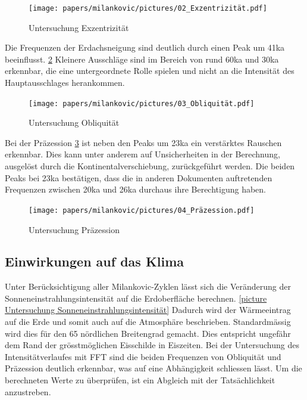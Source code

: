 \begin{figure}
	\centering
	\texttt{[image: papers/milankovic/pictures/02\_Exzentrizität.pdf]}
	\caption{Untersuchung Exzentrizität
		\label{picture Untersuchung Exzentrizität}}
\end{figure}

Die Frequenzen der Erdachsneigung sind deutlich durch einen Peak um 41ka beeinflusst.
	\ref{picture Untersuchung Obliquität}
Kleinere Ausschläge sind im Bereich von rund 60ka und 30ka erkennbar, die eine untergeordnete Rolle spielen und nicht an die Intensität des Hauptausschlages herankommen.

\begin{figure}
	\centering
	\texttt{[image: papers/milankovic/pictures/03\_Obliquität.pdf]}
	\caption{Untersuchung Obliquität
		\label{picture Untersuchung Obliquität}}
\end{figure}

Bei der Präzession
\ref{picture Untersuchung Präzession}
ist neben den Peaks um 23ka ein verstärktes Rauschen erkennbar.
Dies kann unter anderem auf Unsicherheiten in der Berechnung, ausgelöst durch die Kontinentalverschiebung, zurückgeführt werden.
Die beiden Peaks bei 23ka bestätigen, dass die in anderen Dokumenten auftretenden Frequenzen zwischen 20ka und 26ka durchaus ihre Berechtigung haben.

\begin{figure}
	\centering
	\texttt{[image: papers/milankovic/pictures/04\_Präzession.pdf]}
	\caption{Untersuchung Präzession
		\label{picture Untersuchung Präzession}}
\end{figure}

\subsection{Einwirkungen auf das Klima
\label{milankovic:subsection:Einwirkungen auf das Klima}}
Unter Berücksichtigung aller Milankovic-Zyklen lässt sich die Veränderung der Sonneneinstrahlungsintensität auf die Erdoberfläche berechnen.
\ref{picture Untersuchung Sonneneinstrahlungsintensität}
Dadurch wird der Wärmeeintrag auf die Erde und somit auch auf die Atmosphäre beschrieben. Standardmässig wird dies für den 65 nördlichen Breitengrad gemacht.
Dies entspricht ungefähr dem Rand der grösstmöglichen Eisschilde in Eiszeiten.
Bei der Untersuchung des Intensitätverlaufes mit FFT sind die beiden Frequenzen von Obliquität und Präzession deutlich erkennbar, was auf eine Abhängigkeit schliessen lässt.
Um die berechneten Werte zu überprüfen, ist ein Abgleich mit der Tatsächlichkeit anzustreben.


